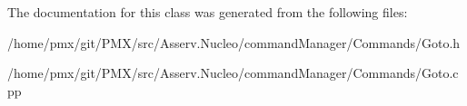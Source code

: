 The documentation for this class was generated from the following files\+:\begin{DoxyCompactItemize}
\item 
/home/pmx/git/\+P\+M\+X/src/\+Asserv.\+Nucleo/command\+Manager/\+Commands/Goto.\+h\item 
/home/pmx/git/\+P\+M\+X/src/\+Asserv.\+Nucleo/command\+Manager/\+Commands/Goto.\+cpp\end{DoxyCompactItemize}
